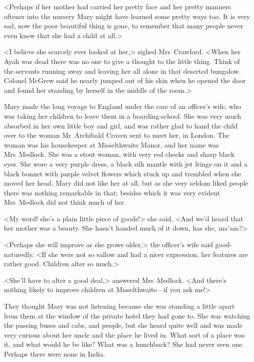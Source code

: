 <Perhaps if her mother had carried her pretty face and her pretty manners oftener into the nursery Mary might have learned some pretty ways too. It is very sad, now the poor beautiful thing is gone, to remember that many people never even knew that she had a child at all.>

<I believe she scarcely ever looked at her,> sighed Mrs~Crawford. <When her Ayah was dead there was no one to give a thought to the little thing. Think of the servants running away and leaving her all alone in that deserted bungalow. Colonel McGrew said he nearly jumped out of his skin when he opened the door and found her standing by herself in the middle of the room.>

Mary made the long voyage to England under the care of an officer's wife, who was taking her children to leave them in a boarding-school. She was very much absorbed in her own little boy and girl, and was rather glad to hand the child over to the woman Mr~Archibald Craven sent to meet her, in London. The woman was his housekeeper at Misselthwaite Manor, and her name was Mrs~Medlock. She was a stout woman, with very red cheeks and sharp black eyes. She wore a very purple dress, a black silk mantle with jet fringe on it and a black bonnet with purple velvet flowers which stuck up and trembled when she moved her head. Mary did not like her at all, but as she very seldom liked people there was nothing remarkable in that; besides which it was very evident Mrs~Medlock did not think much of her.

<My word! she's a plain little piece of goods!> she said. <And we'd heard that her mother was a beauty. She hasn't handed much of it down, has she, ma'am?>

<Perhaps she will improve as she grows older,> the officer's wife said good-naturedly. <If she were not so sallow and had a nicer expression, her features are rather good. Children alter so much.>

<She'll have to alter a good deal,> answered Mrs~Medlock. <And there's nothing likely to improve children at Misselthwaite—if you ask me!>

They thought Mary was not listening because she was standing a little apart from them at the window of the private hotel they had gone to. She was watching the passing buses and cabs, and people, but she heard quite well and was made very curious about her uncle and the place he lived in. What sort of a place was it, and what would he be like? What was a hunchback? She had never seen one. Perhaps there were none in India.

